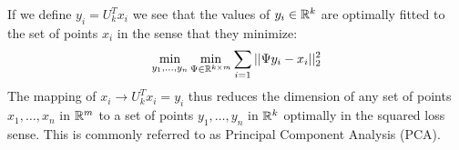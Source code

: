 \documentclass{article}
\begin{document}
If we define $y_i = U_{k}^{T}x_{i}$ we see that the values of $y_i \in {\mathbb{R}}^{k}$ are optimally fitted to the set of points $x_i$ in the 
sense that they minimize:
\[
\min_{y_1,\ldots,y_n } \min_{\Psi \in {\mathbb{R}}^{k \times m}}\sum_{i=1} ||\Psi y_i - x_{i}||_{2}^{2}
\] 
The mapping of $x_i \rightarrow  U_{k}^{T}x_i = y_i $ thus reduces the dimension of any set of points  $x_1,\ldots,x_n$ in ${\mathbb{R}}^{m}$ to 
a set of points $y_1,\ldots,y_n$ in ${\mathbb{R}}^{k}$ optimally in the squared loss sense. This is commonly referred to as Principal Component Analysis (PCA).
\end{document}
